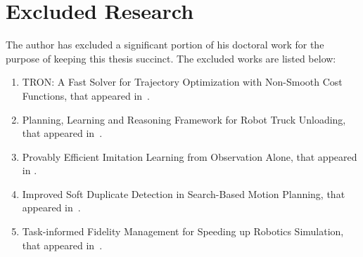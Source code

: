 \section{Excluded Research}
\label{sec:excluded-research}

The author has excluded a significant portion of his doctoral work for the
purpose of keeping this thesis succinct. The excluded works are listed below:
\begin{enumerate}
  \item TRON: A Fast Solver for Trajectory Optimization with Non-Smooth Cost
        Functions, that appeared in~\cite{tron}.
  \item Planning, Learning and Reasoning Framework for Robot Truck Unloading,
        that appeared in~\cite{truck}.
  \item Provably Efficient Imitation Learning from Observation Alone, that
        appeared in \cite{fail}.
  \item Improved Soft Duplicate Detection in Search-Based Motion Planning, that
        appeared in~\cite{duplicate}.
  \item Task-informed Fidelity Management for Speeding up Robotics Simulation,
        that appeared in~\cite{fidelity}.
\end{enumerate}


